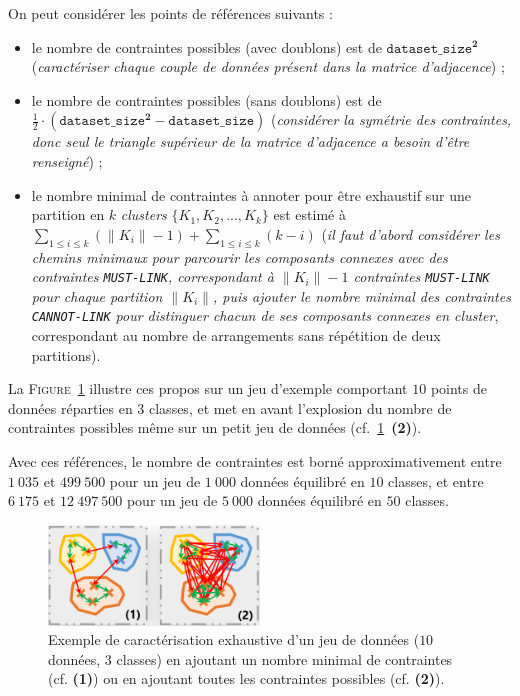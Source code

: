 			\begin{leftBarAuthorOpinion}
				On peut considérer les points de références suivants :
				\begin{itemize}
					\item le nombre de contraintes possibles (avec doublons) est de $\texttt{dataset\_size}^{\textbf{2}}$ (\textit{caractériser chaque couple de données présent dans la matrice d'adjacence}) ;
					\item le nombre de contraintes possibles (sans doublons) est de $\frac{1}{2} \cdot (\texttt{dataset\_size}^{\textbf{2}} - \texttt{dataset\_size})$ (\textit{considérer la symétrie des contraintes, donc seul le triangle supérieur de la matrice d'adjacence a besoin d'être renseigné}) ;
					\item le nombre minimal de contraintes à annoter pour être exhaustif sur une partition en $k$ \textit{clusters} $\{K_{1}, K_{2}, ..., K_{k}\} $ est estimé à ${\displaystyle \sum\limits_{1 \leq i \leq k}{(\|K_{i}\|-1)} + \sum\limits_{1 \leq i \leq k}{(k-i)}} $
					(\textit{il faut d'abord considérer les chemins minimaux pour parcourir les composants connexes avec des contraintes \texttt{MUST-LINK}, correspondant à $\|K_{i}\|-1$ contraintes \texttt{MUST-LINK} pour chaque partition $\|K_{i}\|$, puis ajouter le nombre minimal des contraintes \texttt{CANNOT-LINK} pour distinguer chacun de ses composants connexes en \textit{cluster}}, correspondant au nombre de arrangements sans répétition de deux partitions).
				\end{itemize}
				La \textsc{Figure~\ref{figure:4.3.3-ETUDE-COUT-NOMBRE-CONTRAINTES-EXEMPLES}} illustre ces propos sur un jeu d'exemple comportant $10$ points de données réparties en $3$ classes, et met en avant l'explosion du nombre de contraintes possibles même sur un petit jeu de données (cf.~\ref{figure:4.3.3-ETUDE-COUT-NOMBRE-CONTRAINTES-EXEMPLES}~\textbf{(2)}).
				
				Avec ces références, le nombre de contraintes est borné approximativement
				entre $1~035$ et $499~500$ pour un jeu de $1~000$ données équilibré en $10$ classes,
				et entre $6~175$ et $12~497~500$ pour un jeu de $5~000$ données équilibré en $50$ classes.
				\begin{figure}[H]
					\centering
					\includegraphics[width=0.5\textwidth]{figures/etude-nombre-contraintes-2-bornes-limites}
					\caption{
						Exemple de caractérisation exhaustive d'un jeu de données ($10$ données, $3$ classes) en ajoutant un nombre minimal de contraintes (cf. \textbf{(1)}) ou en ajoutant toutes les contraintes possibles (cf. \textbf{(2)}).
					}
					\label{figure:4.3.3-ETUDE-COUT-NOMBRE-CONTRAINTES-EXEMPLES}
				\end{figure}
			\end{leftBarAuthorOpinion}

